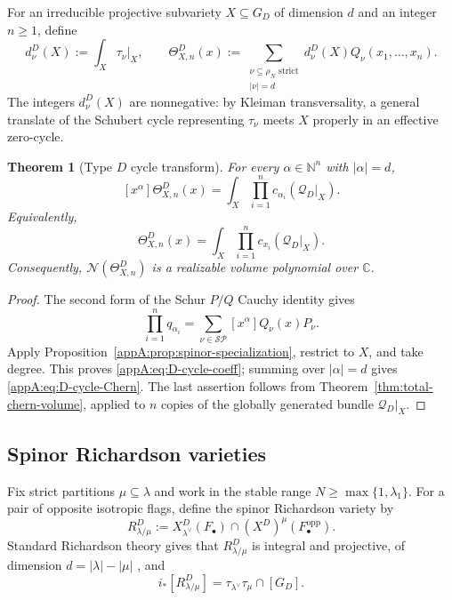 \documentclass[11pt,a4paper,oneside]{amsart}
\numberwithin{equation}{section}
\newtheorem{theorem}{Theorem}[section]
\theoremstyle{definition}
\theoremstyle{remark}
\newcommand{\cN}{\mathcal N}
\begin{document}
For an irreducible projective subvariety $X\subseteq G_D$ of dimension $d$
and an integer $n\ge1$, define
\begin{equation}
\label{appA:eq:D-cycle-transform}
  d_\nu^D(X):=\int_X\tau_\nu|_X,
  \qquad
  \Theta^D_{X,n}(x):=
  \sum_{\substack{\nu\subseteq\rho_N\text{ strict}\\|\nu|=d}}
  d_\nu^D(X)Q_\nu(x_1,\ldots,x_n).
\end{equation}
The integers $d_\nu^D(X)$ are nonnegative: by Kleiman transversality, a
general translate of the Schubert cycle representing $\tau_\nu$ meets $X$
properly in an effective zero-cycle.

\begin{theorem}[Type $D$ cycle transform]
\label{appA:thm:D-cycle-transform}
For every $\alpha\in\mathbb N^n$ with $|\alpha|=d$,
\begin{equation}
\label{appA:eq:D-cycle-coeff}
  [x^\alpha]\Theta^D_{X,n}(x)
  =\int_X\prod_{i=1}^n c_{\alpha_i}(\mathcal Q_D|_X).
\end{equation}
Equivalently,
\begin{equation}
\label{appA:eq:D-cycle-Chern}
  \Theta^D_{X,n}(x)
  =\int_X\prod_{i=1}^n c_{x_i}(\mathcal Q_D|_X).
\end{equation}
Consequently, $\cN(\Theta^D_{X,n})$ is a realizable volume polynomial
over $\mathbb C$.
\end{theorem}

\begin{proof}
The second form of the Schur $P/Q$ Cauchy identity gives
\[
  \prod_{i=1}^n q_{\alpha_i}
  =\sum_{\nu\in\mathcal{SP}}[x^\alpha]Q_\nu(x)P_\nu.
\]
Apply Proposition~\ref{appA:prop:spinor-specialization}, restrict to $X$, and
take degree.  This proves \eqref{appA:eq:D-cycle-coeff}; summing over
$|\alpha|=d$ gives \eqref{appA:eq:D-cycle-Chern}.  The last assertion follows from Theorem~\ref{thm:total-chern-volume},
applied to $n$ copies of the globally generated bundle $\mathcal Q_D|_X$.
\end{proof}

\subsection{Spinor Richardson varieties}
\label{appA:spinor-Richardson}

Fix strict partitions $\mu\subseteq\lambda$ and work in the stable range
$N\ge\max\{1,\lambda_1\}$.  For a pair of opposite isotropic flags, define the spinor Richardson variety by
\begin{equation}
\label{appA:eq:D-Richardson}
  R^D_{\lambda/\mu}
  :=X^D_{\lambda^\vee}(F_\bullet)
    \cap (X^D)^\mu(F_\bullet^{\mathrm{opp}}).
\end{equation}
Standard Richardson theory gives that $R^D_{\lambda/\mu}$ is integral and
projective, of dimension $d=|\lambda|-|\mu|$ \cite[Section~1.3]{Brion05}, and
\begin{equation}
\label{appA:eq:D-Richardson-class}
  i_*[R^D_{\lambda/\mu}]
  =\tau_{\lambda^\vee}\tau_\mu\cap[G_D].
\end{equation}
\end{document}
